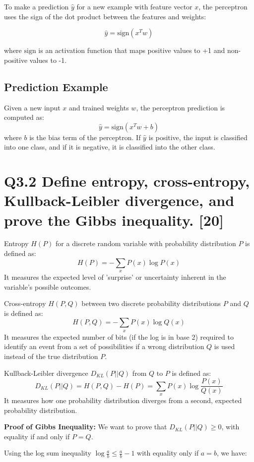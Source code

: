 \documentclass[11pt]{article}
\begin{document}
To make a prediction \( \hat{y} \) for a new example with feature vector \( x \), the perceptron uses the sign of the dot product between the features and weights:

\[
\hat{y} = \text{sign}(x^T w)
\]

where \( \text{sign} \) is an activation function that maps positive values to +1 and non-positive values to -1.

\subsection*{Prediction Example}
Given a new input \( x \) and trained weights \( w \), the perceptron prediction is computed as:
\[
\hat{y} = \text{sign}(x^T w + b)
\]
where \( b \) is the bias term of the perceptron. If \( \hat{y} \) is positive, the input is classified into one class, and if it is negative, it is classified into the other class.


\section{Q3.2 Define entropy, cross-entropy, Kullback-Leibler divergence, and prove the Gibbs inequality. [20]}

Entropy \( H(P) \) for a discrete random variable with probability distribution \( P \) is defined as:
\[
H(P) = - \sum_x P(x) \log P(x)
\]
It measures the expected level of 'surprise' or uncertainty inherent in the variable's possible outcomes.

Cross-entropy \( H(P, Q) \) between two discrete probability distributions \( P \) and \( Q \) is defined as:
\[
H(P, Q) = - \sum_x P(x) \log Q(x)
\]
It measures the expected number of bits (if the log is in base 2) required to identify an event from a set of possibilities if a wrong distribution \( Q \) is used instead of the true distribution \( P \).

Kullback-Leibler divergence \( D_{KL}(P||Q) \) from \( Q \) to \( P \) is defined as:
\[
D_{KL}(P||Q) = H(P, Q) - H(P) = \sum_x P(x) \log \frac{P(x)}{Q(x)}
\]
It measures how one probability distribution diverges from a second, expected probability distribution.

\textbf{Proof of Gibbs Inequality:}
We want to prove that \( D_{KL}(P||Q) \geq 0 \), with equality if and only if \( P = Q \).

Using the log sum inequality \( \log \frac{a}{b} \leq \frac{a}{b} - 1 \) with equality only if \( a = b \), we have:
\end{document}
